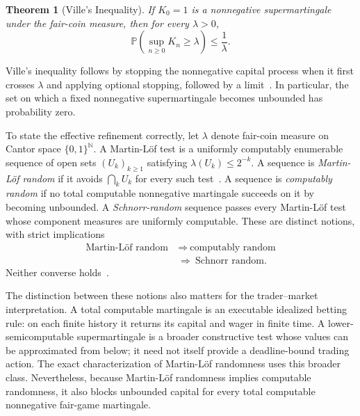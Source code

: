 \documentclass[aps,pra,reprint,superscriptaddress,amsmath,amssymb,floatfix]{revtex4-2}
\theoremstyle{plain}
\newtheorem{theorem}{Theorem}
\theoremstyle{definition}
\theoremstyle{remark}
\begin{document}
\begin{theorem}[Ville's Inequality]
  \label{thm:ville}
  If \(K_0=1\) is a nonnegative supermartingale under the fair-coin measure,
  then
  for every \(\lambda>0\),
  \begin{equation}
    \mathbb{P}\!\left(\sup_{n\geq0}K_n\geq\lambda\right)
    \leq\frac1\lambda.
    \label{eq:ville}
  \end{equation}
\end{theorem}

Ville's inequality follows by stopping the nonnegative capital process when it
first crosses \(\lambda\) and applying optional stopping, followed by a
limit~\cite{Ville1939}. In particular, the set on which a fixed nonnegative
supermartingale becomes unbounded has probability zero.

To state the effective refinement correctly, let \(\lambda\) denote fair-coin
measure on Cantor space \(\{0,1\}^{\mathbb N}\). A Martin-L\"of test is a
uniformly computably enumerable sequence of open sets
\((U_k)_{k\geq1}\) satisfying \(\lambda(U_k)\leq2^{-k}\). A sequence is
\emph{Martin-L\"of random} if it avoids \(\bigcap_k U_k\) for every such
test~\cite{MartinLof1966}. A sequence is \emph{computably random} if no total
computable nonnegative martingale succeeds on it by becoming unbounded. A
\emph{Schnorr-random} sequence passes every Martin-L\"of test whose component
measures are uniformly computable. These are distinct notions, with strict
implications
\begin{equation}
  \begin{aligned}
    \text{Martin-L\"of random}
      &\ \Longrightarrow\ \text{computably random}\\
      &\ \Longrightarrow\ \text{Schnorr random}.
  \end{aligned}
  \label{eq:randomhierarchy}
\end{equation}
Neither converse holds~\cite{schnorr1,Nies2009,DH}.

The distinction between these notions also matters for the trader--market
interpretation. A total computable martingale is an executable idealized
betting rule: on each finite history it returns its capital and wager in finite
time. A lower-semicomputable supermartingale is a broader constructive test
whose values can be approximated from below; it need not itself provide a
deadline-bound trading action. The exact characterization of Martin-L\"of
randomness uses this broader class. Nevertheless, because Martin-L\"of
randomness implies computable randomness, it also blocks unbounded capital for
every total computable nonnegative fair-game martingale.
\end{document}
